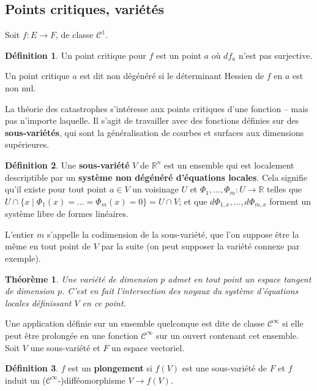 \documentclass{article}
\newcommand{\cun}{\mathcal{C}^1}
\newcommand{\cinf}{\mathcal{C}^\infty}
\newcommand{\R}{\mathbb{R}}
\newtheorem{thm}{Théorème}
\theoremstyle{definition}
\newtheorem{defn}{Définition}
\begin{document}
\subsection{Points critiques, variétés}

Soit $f:E\to F$, de classe $\cun$.
\begin{defn}
	Un point critique pour $f$ est un point $a$ où $df_a$ n'est pas surjective.

	Un point critique $a$ est dit non dégénéré si le déterminant Hessien de $f$ en $a$ est non nul.
\end{defn}

La théorie des catastrophes s'intéresse aux points critiques d'une fonction -- mais pas n'importe laquelle.
Il s'agit de travailler avec des fonctions définies sur des \textbf{sous-variétés}, qui sont la généralisation de courbes et surfaces aux dimensions supérieures.
\begin{defn}
	Une \textbf{sous-variété} $V$ de $\R^n$ est un ensemble qui est localement descriptible par un \textbf{système non dégénéré d'équations locales}.
	Cela signifie qu'il existe pour tout point $a\in V$ un voisinage $U$ et $\Phi_1,...,\Phi_m: U \to\R$ telles que $U\cap\{x\mid \Phi_1(x)=...=\Phi_m(x)=0\}=U\cap V$; et que $d\Phi_{1,x},...,d\Phi_{m,x}$ forment un système libre de formes linéaires.

	L'entier $m$ s'appelle la codimension de la sous-variété, que l'on suppose être la même en tout point de $V$ par la suite (on peut supposer la variété connexe par exemple).
\end{defn}
\begin{thm}
	Une variété de dimension $p$ admet en tout point un espace tangent de dimension $p$.
	C'est en fait l'intersection des noyaux du système d'équations locales définissant $V$ en ce point.
\end{thm}

Une application définie sur un ensemble quelconque est dite de classe $\cinf$ si elle peut être prolongée en une fonction $\cinf$ sur un ouvert contenant cet ensemble. Soit $V$ une sous-variété et $F$ un espace vectoriel.
\begin{defn}

	$f$ est un \textbf{plongement} si $f(V)$ est une sous-variété de $F$ et $f$ induit un ($\cinf$-)difféomorphisme $V\to f(V)$.
\end{defn}
\end{document}
